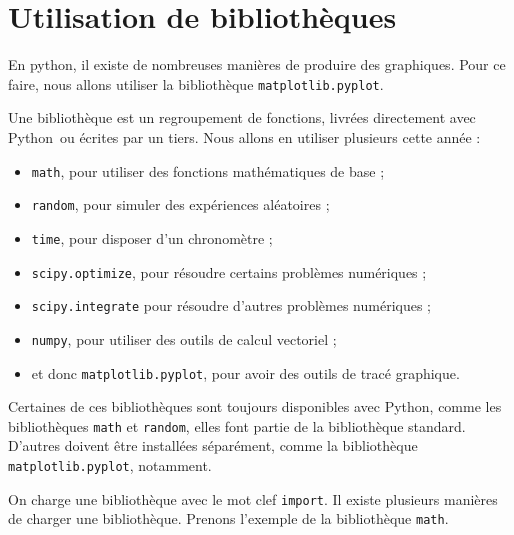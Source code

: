 \section{Utilisation de bibliothèques}

En python, il existe de nombreuses manières de produire des graphiques. 
Pour ce faire, nous allons utiliser la bibliothèque \texttt{matplotlib.pyplot}. 

Une bibliothèque est un regroupement de fonctions, livrées directement avec Python\ ou écrites par un tiers.
Nous allons en utiliser plusieurs cette année : 
\begin{itemize}
  \item \texttt{math}, pour utiliser des fonctions mathématiques de base ; 
  \item \texttt{random}, pour simuler des expériences aléatoires ; 
  \item \texttt{time}, pour disposer d'un chronomètre ;
  \item \texttt{scipy.optimize}, pour résoudre certains problèmes numériques ; 
  \item \texttt{scipy.integrate} pour résoudre d'autres problèmes numériques ;
  \item \texttt{numpy}, pour utiliser des outils de calcul vectoriel ; 
  \item et donc \texttt{matplotlib.pyplot}, pour avoir des outils de tracé graphique. 
\end{itemize}
Certaines de ces bibliothèques sont toujours disponibles avec Python, comme les bibliothèques \texttt{math} et \texttt{random}, elles font partie de la bibliothèque standard. 
D'autres doivent être installées séparément, comme la bibliothèque \texttt{matplotlib.pyplot}, notamment. 

On charge une bibliothèque avec le mot clef \texttt{import}. Il existe plusieurs manières de charger une bibliothèque. Prenons l'exemple de la bibliothèque \texttt{math}. 

